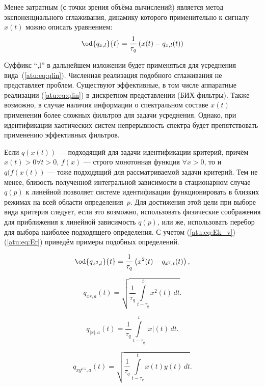 Менее затратным (с точки зрения объёма вычислений)
является метод экспоненциального сглаживания,
динамику которого применительно к сигналу $x(t)$ можно описать уравнением:
%
\begin{equation}
\od{q_{x,l}}{t}
=
\frac{1}{\tau_q} \left( x(t) - q_{x,l}(t) \right)
\label{atu:eq:qlin}
\end{equation}

Суффикс ``,l'' в дальнейшем изложении будет применяться
для усреднения вида~(\ref{atu:eq:qlin}).
Численная реализация подобного сглаживания не представляет
проблем. Существуют эффективные, в том числе аппаратные
реализации (\ref{atu:eq:qlin}) в дискретном представлении (БИХ-фильтры).
Также возможно, в случае наличия информации о спектральном составе $x(t)$
применении более сложных фильтров для задачи усреднения.
Однако, при идентификации хаотических систем непрерывность спектра
будет препятствовать применению эффективных фильтров.


Если $q(x(t))$  --- подходящий для задачи идентификации критерий,
причём $x(t)>0 \forall t>0$,
$f(x)$ --- строго монотонная функция $\forall x > 0 $,
то и $q(f(x(t))$ --- тоже подходящий для рассматриваемой задачи критерий.
Тем не менее, близость полученной интегральной зависимости в стационарном случае $q(p)$
к линейной позволяет системе идентификации функционировать в близких режимах
на всей области определения~$p$. Для достижения этой цели
при выборе вида критерия следует, если это возможно,
использовать физические соображения для приближения к линейной зависимость $q(p)$,
или же, использовать перебор для выбора наиболее подходящего определения.
С учетом (\ref{atu:eq:Ek_v})--(\ref{atu:eq:Er}) приведём
примеры подобных определений.


\begin{equation}
\od{q_{x^2,l}}{t}
=
\frac{1}{\tau_q} \left( x^2(t) - q_{x^2,t}(t) \right)
,
\label{atu:eq:qx2l}
\end{equation}

\begin{equation}
  q_{xr,a}(t) =
  \sqrt{
    \frac{1}{\tau_q}
    \int\limits_{t-\tau_q}^{t} x^2(t) \, dt
  }.
  \label{atu:eq:qxra}
\end{equation}

\begin{equation}
  q_{|x|,a}(t) =
  \frac{1}{\tau_q}
  \int\limits_{t-\tau_q}^{t} |x|(t) \, dt
  .
  \label{atu:eq:qxma}
\end{equation}

\begin{equation}
  q_{xy^{0.5},a}(t) =
  \sqrt{
    \frac{1}{\tau_q}
    \int\limits_{t-\tau_q}^{t} x(t)y(t) \, dt
  }
  .
  \label{atu:eq:qxy05a}
\end{equation}


